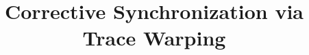 \documentclass[preprint,nocopyrightspace]{sigplanconf}
\begin{document}
\title{Corrective Synchronization via Trace Warping}
\makeatletter
\def \@ivtitleauthors#1#2#3#4{%
	\if \@andp{\@emptyargp{#2}}{\@emptyargp{#3}}%
	\noindent \@setauthor{40pc}{#1}{\@false}\par
	\else\if \@emptyargp{#3}%
	\noindent \@setauthor{17pc}{#1}{\@false}\hspace{3pc}%
	\@setauthor{17pc}{#2}{\@false}\par
	\else\if \@emptyargp{#4}%
	\noindent \@setauthor{17pc}{#1}{\@false}\hspace{3pc}%
	\@setauthor{17pc}{#3}{\@false}\par
	\else
	\noindent \@setauthor{9.3333pc}{#1}{\@false}\hspace{1.5pc}%
	\@setauthor{9.3333pc}{#2}{\@false}\hspace{1.5pc}%
	\@setauthor{9.3333pc}{#3}{\@false}\hspace{1.5pc}%
	\@setauthor{9.3333pc}{#4}{\@true}\par
	\relax
	\fi\fi\fi
	\vspace{20pt}}
\def \@maketitle {%
	\begin{center}
		\@settitlebanner
		\let \thanks = \titlenote
		{\leftskip = 0pt plus 0.25\linewidth
			\rightskip = 0pt plus 0.25 \linewidth
			\parfillskip = 0pt
			\spaceskip = .7em
			\noindent \LARGE \bfseries \@titletext \par}
		\vskip 6pt
		\noindent \Large \@subtitletext \par
		\vskip 12pt
		\ifcase \@authorcount
		\@latex@error{No authors were specified for this paper}{}\or
		\@titleauthors{i}{}{}\or
		\@titleauthors{i}{ii}{}\or
		\@titleauthors{i}{ii}{iii}\or
		\@ivtitleauthors{i}{ii}{iii}{iv}\or
		\@titleauthors{i}{ii}{iii}\@titleauthors{iv}{v}{}\or
		\@titleauthors{i}{ii}{iii}\@titleauthors{iv}{v}{vi}\or
		\@titleauthors{i}{ii}{iii}\@titleauthors{iv}{v}{vi}%
		\@titleauthors{vii}{}{}\or
		\@titleauthors{i}{ii}{iii}\@titleauthors{iv}{v}{vi}%
		\@titleauthors{vii}{viii}{}\or
		\@titleauthors{i}{ii}{iii}\@titleauthors{iv}{v}{vi}%
		\@titleauthors{vii}{viii}{ix}\or
		\@titleauthors{i}{ii}{iii}\@titleauthors{iv}{v}{vi}%
		\@titleauthors{vii}{viii}{ix}\@titleauthors{x}{}{}\or
		\@titleauthors{i}{ii}{iii}\@titleauthors{iv}{v}{vi}%
		\@titleauthors{vii}{viii}{ix}\@titleauthors{x}{xi}{}\or
		\@titleauthors{i}{ii}{iii}\@titleauthors{iv}{v}{vi}%
		\@titleauthors{vii}{viii}{ix}\@titleauthors{x}{xi}{xii}%
		\else
		\@latex@error{Cannot handle more than 12 authors}{}%
		\fi
		\vspace{1.75pc}
	\end{center}}
	\makeatother
	
\end{document}

